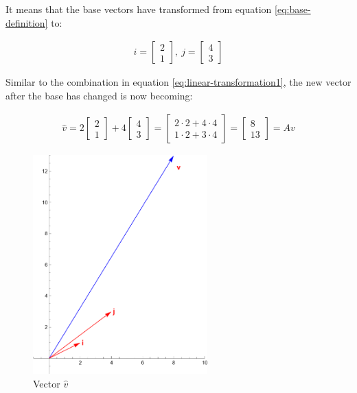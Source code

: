 \documentclass[stu,12pt,floatsintext]{apa7}
\begin{document}
It means that the base vectors have transformed from equation \ref{eq:base-definition} to: 

\begin{gather}
    i=\begin{bmatrix}
        2\\1
    \end{bmatrix},\ j=\begin{bmatrix}
        4\\3
    \end{bmatrix}
\end{gather}    

Similar to the combination in equation \ref{eq:linear-transformation1}, the new vector after the base has changed is now becoming:

\begin{gather}
    \hat{v}=2\begin{bmatrix}
        2\\1
    \end{bmatrix}+4\begin{bmatrix}
        4\\3
    \end{bmatrix}=\begin{bmatrix}
        2\cdot2+4\cdot 4 \\ 1\cdot2+3\cdot4
    \end{bmatrix}=\begin{bmatrix}
        8\\13
    \end{bmatrix}=Av
\end{gather}

\begin{figure}[h]
    \centering
    \includegraphics[width=0.6\textwidth]{images/vector2.png}
    \caption{Vector $\hat{v}$}
    \label{fig:vector1}
\end{figure}
\end{document}
